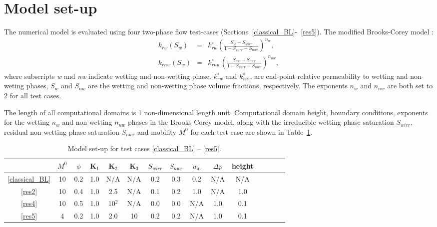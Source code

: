 \documentclass[times]{fldauth}
\begin{document}
\section{Model set-up}\label{setup}
The numerical model is evaluated using four two-phase flow test-cases (Sections~\ref{classical_BL}-~\ref{res5}). The modified Brooks-Corey model \cite{Alpak_1999,brooks_1964}: 
\begin{eqnarray}
   k_{rw}\left ( S_{w} \right ) &=& k_{rw}^{\circ} \left ( \frac{S_w-S_{wirr}}{1-S_{wirr}-S_{nwr}} \right )^{n_w}, \\
   k_{rnw}\left ( S_{w} \right ) &=& k_{rnw}^{\circ} \left ( \frac{S_{nw}-S_{nwr}}{1-S_{wirr}-S_{nwr}} \right)^{n_{nw}}, 
\end{eqnarray}
where subscripts {\it w} and {\it nw} indicate wetting and non-wetting phase. $k_{rw}^{\circ}$ and $k_{rnw}^{\circ}$ are end-point relative permeability to wetting and non-weting phases, $S_w$ and $S_{nw}$ are the wetting and non-wetting phase volume fractions, respectively. The exponents $n_w$ and $n_{nw}$ are both set to 2 for all test cases.

The length of all computational domains is 1 non-dimensional length
unit. Computational domain height, boundary conditions, exponents for
the wetting $n_w$ and non-wetting $n_{nw}$ phases in the Brooks-Corey
model, along with the irreducible wetting phase saturation $S_{wirr}$,
residual non-wetting phase saturation $S_{nwr}$ and mobility $M^0$ for
each test case are shown in Table~\ref{tab:1}.

\begin{table}[h!]
  \centering
  \small{
    \caption{Model set-up for test cases \ref{classical_BL} --
      \ref{res5}.\label{tab:1}}
    \begin{tabular}{c c c c c c c c c c c c c c c} 
      \hline
      & $M^0$ & $\phi$ & $\mathbf{K}_\text{1}$ & $\mathbf{K}_\text{2}$ & $\mathbf{K}_\text{3}$ & $S_{wirr}$ & $S_{nwr}$ & $u_{\mathrm{in}}$ & $\Delta p$ & height \\ \hline
      \ref{classical_BL} & 10 & 0.2 & 1.0 & N/A    & N/A & 0.2   & 0.3 & 0.2 & N/A & N/A\\
      \ref{res2}         & 10 & 0.4 & 1.0 & 2.5    & N/A & 0.1   & 0.2 & 1.0 & N/A & 1.0\\ 
      \ref{res4}         & 10 & 0.5 & 1.0 & 10$^2$ & N/A & 0.0   & 0.0 & N/A & 1.0 & 0.1\\
      \ref{res5}         & 4  & 0.2 & 1.0 & 2.0    & 10  & 0.2   & 0.2 & N/A & 1.0 & 0.1\\ \hline
    \end{tabular}
  }
\end{table}
\end{document}
